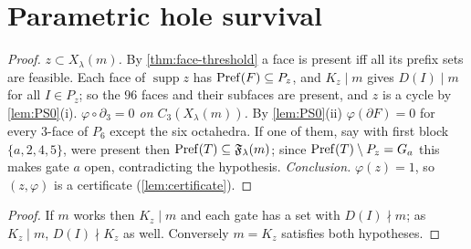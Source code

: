 \section{Parametric hole survival}
\begin{proof}
\emph{$z\subset X_\lambda(m)$.} By \cref{thm:face-threshold} a face is present iff all its prefix sets are feasible. Each face of $\operatorname{supp}z$ has $\mathrm{Pref}(F)\subseteq P_z$, and $K_z\mid m$ gives $D(I)\mid m$ for all $I\in P_z$; so the $96$ faces and their subfaces are present, and $z$ is a cycle by \cref{lem:PS0}(i).
\emph{$\varphi\circ\partial_3=0$ on $C_3(X_\lambda(m))$.} By \cref{lem:PS0}(ii) $\varphi(\partial F)=0$ for every $3$-face of $P_6$ except the six octahedra. If one of them, say with first block $\{a,2,4,5\}$, were present then $\mathrm{Pref}(T)\subseteq\mathfrak F_\lambda(m)$; since $\mathrm{Pref}(T)\setminus P_z=G_a$ this makes gate $a$ open, contradicting the hypothesis.
\emph{Conclusion.} $\varphi(z)=1$, so $(z,\varphi)$ is a certificate (\cref{lem:certificate}).
\end{proof}
\begin{proof}
If $m$ works then $K_z\mid m$ and each gate has a set with $D(I)\nmid m$; as $K_z\mid m$, $D(I)\nmid K_z$ as well. Conversely $m=K_z$ satisfies both hypotheses.
\end{proof}
